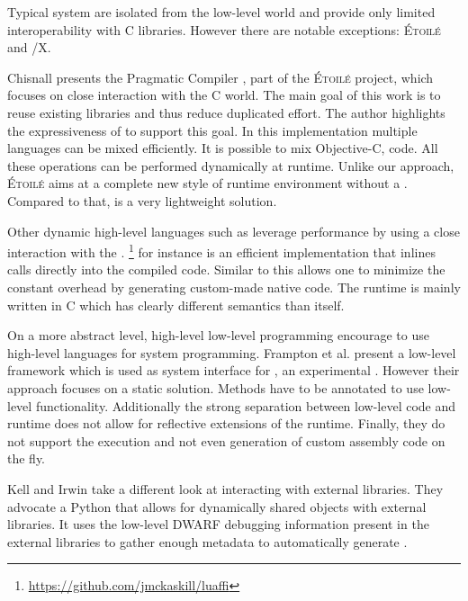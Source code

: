 
Typical \ST system are isolated from the low-level world and provide only limited interoperability with C libraries.
However there are notable exceptions: \textsc{Étoilé} and \ST/X.

Chisnall presents the Pragmatic \ST Compiler \cite{Chis12a}, part of the \textsc{Étoilé} project, which focuses on close interaction with the C world.
The main goal of this work is to reuse existing libraries and thus reduce duplicated effort.
The author highlights the expressiveness of \ST to support this goal.
In this \ST implementation multiple languages can be mixed efficiently.
It is possible to mix Objective-C, \ST code.
All these operations can be performed dynamically at runtime.
Unlike our approach, \textsc{Étoilé} aims at a complete new style of runtime environment without a \VM.
Compared to that, \NB is a very lightweight solution.


Other dynamic high-level languages such as \Lua leverage \FFI performance by using a close interaction with the \JIT.
\LuaJIT\footnote{\url{https://github.com/jmckaskill/luaffi}} for instance is an efficient \Lua implementation that inlines \FFI calls directly into the \JIT compiled code.
Similar to \NB this allows one to minimize the constant overhead by generating custom-made native code.
The \LuaJIT runtime is mainly written in C which has clearly different semantics than \Lua itself.


On a more abstract level, high-level low-level programming \cite{Fram09a} encourage to use high-level languages for system programming.
Frampton et al. present a low-level framework  which is used as system interface for \Jikes, an experimental \Java \VM.
However their approach focuses on a static solution.
Methods have to be annotated to use low-level functionality.
Additionally the strong separation between low-level code and runtime does not allow for reflective extensions of the runtime.
Finally, they do not support the execution and not even generation of custom assembly code on the fly.


Kell and Irwin \cite{Kell11a} take a different look at interacting with external libraries.
They advocate a Python \VM that allows for dynamically shared objects with external libraries.
It uses the low-level DWARF debugging information present in the external libraries to gather enough metadata to automatically generate \FFIs.

